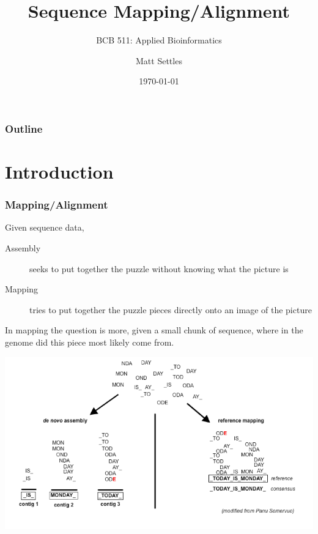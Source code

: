 \documentclass[pdf]{beamer}
\begin{document}
\title[Sequence Mapping]{Sequence Mapping/Alignment}
\subtitle{BCB 511: Applied Bioinformatics\\}
\author[Matt Settles]{Matt Settles}
\date{\today}


\begin{frame}[plain]
  \titlepage
\end{frame}


\begin{frame}[plain] 
  \frametitle{Outline}
  \tableofcontents
\end{frame}

\section{Introduction}
\begin{frame}
  \frametitle{Mapping/Alignment}
Given sequence data,
\begin{description}
\item[Assembly]  seeks to put together the puzzle without knowing what the picture is 
\item[Mapping]  tries to put together the puzzle pieces directly onto an image of the picture
\end{description}
\vspace{0.1in}
In mapping the question is more, given a small chunk of sequence, where in the genome did this piece most likely come from.
\end{frame}

\begin{frame}
\begin{center}
\includegraphics[scale=0.35]{Figures/Differences.png} 
\end{center}
\end{frame}
\end{document}

